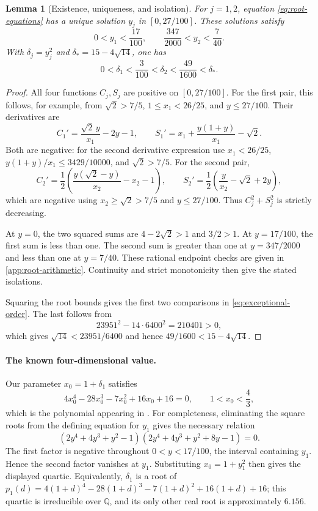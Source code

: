 \documentclass[11pt]{article}
\numberwithin{equation}{section}
\newtheorem{lemma}[lemma]{Lemma}
\theoremstyle{definition}
\theoremstyle{definition}
\begin{document}
\begin{lemma}[Existence, uniqueness, and isolation]
\label{lem:root-isolation}
For $j=1,2$, equation \eqref{eq:root-equations} has a unique solution
$y_j$ in $[0,27/100]$.  These solutions satisfy
\[
 0<y_1<\frac{17}{100},\qquad
 \frac{347}{2000}<y_2<\frac7{40}.
\]
With $\delta_j=y_j^2$ and $\delta_*=15-4\sqrt{14}$, one has
\begin{equation}
 0<\delta_1<\frac{3}{100}<\delta_2<\frac{49}{1600}<\delta_*.
 \label{eq:exceptional-order}
\end{equation}
\end{lemma}
\begin{proof}
All four functions $C_j,S_j$ are positive on $[0,27/100]$.
For the first pair, this follows, for example, from
$\sqrt2>7/5$, $1\le x_1<26/25$, and $y\le27/100$.
Their derivatives are
\[
 C_1'=\frac{\sqrt2\,y}{x_1}-2y-1,
 \qquad
 S_1'=x_1+\frac{y(1+y)}{x_1}-\sqrt2.
\]
Both are negative: for the second derivative expression use
$x_1<26/25$, $y(1+y)/x_1\le3429/10000$, and $\sqrt2>7/5$.
For the second pair,
\[
 C_2'=\frac12\left(\frac{y(\sqrt2-y)}{x_2}-x_2-1\right),
 \qquad
 S_2'=\frac12\left(\frac{y}{x_2}-\sqrt2+2y\right),
\]
which are negative using $x_2\ge\sqrt2>7/5$ and $y\le27/100$.
Thus $C_j^2+S_j^2$ is strictly decreasing.

At $y=0$, the two squared sums are $4-2\sqrt2>1$ and $3/2>1$.
At $y=17/100$, the first sum is less than one. The second sum is
greater than one at $y=347/2000$ and less than one at $y=7/40$.
These rational endpoint checks are given in
\cref{app:root-arithmetic}. Continuity and strict monotonicity
then give the stated isolations.

Squaring the root bounds gives the first two comparisons in
\eqref{eq:exceptional-order}. The last follows from
\[
 23951^2-14\cdot6400^2=210401>0,
\]
which gives $\sqrt{14}<23951/6400$ and hence
$49/1600<15-4\sqrt{14}$.
\end{proof}

\paragraph{The known four-dimensional value.}
Our parameter $x_0=1+\delta_1$ satisfies
\[
 4x_0^4-28x_0^3-7x_0^2+16x_0+16=0,
 \qquad 1<x_0<\frac43,
\]
which is the polynomial appearing in \cite{Shultz2013}.
For completeness, eliminating the square roots from the defining
equation for $y_1$ gives the necessary relation
\[
 (2y^4+4y^3+y^2-1)(2y^4+4y^3+y^2+8y-1)=0.
\]
The first factor is negative throughout $0<y<17/100$, the
interval containing $y_1$. Hence the second factor vanishes
at $y_1$. Substituting $x_0=1+y_1^2$
then gives the displayed quartic. Equivalently, $\delta_1$ is a root of
$p_1(d)=4(1+d)^4-28(1+d)^3-7(1+d)^2+16(1+d)+16$; this quartic is
irreducible over $\mathbb Q$, and its only other real root is
approximately $6.156$.
\end{document}
